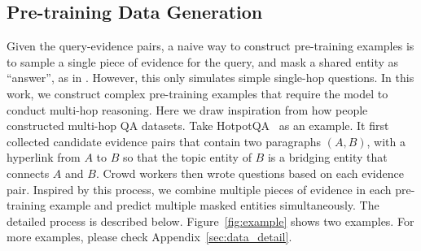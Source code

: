 \documentclass[11pt]{article}
\newcommand{\revise}[1]{#1}
\newcommand{\nop}[1]{}
\begin{document}
\begin{table}[t]
    \centering
    \vspace{-0.5em}
    \caption{Statistics about the pre-training data.}\vspace{-0.25em}
    \label{tab:pretrain_data}
\end{table}

\begin{table}[t]
    \centering
    \vspace{-0.5em}
    \caption{\revise{Analysis of pre-training data quality with 50 examples for each setting. \textit{One different} is when  the relation between the selected entities is different from the relation expressed in the query sentence for of the two pieces of evidence.}}\vspace{-1.25em}
    \label{tab:pretrain_data_quality}
\end{table} \subsection{Pre-training Data Generation}
\label{sec:data_generation}
Given the query-evidence pairs, a naive way to construct pre-training examples is to sample a single piece of evidence for the query, and mask a shared entity as ``answer'', as in \citet{glass-etal-2020-span}. However, this only simulates simple single-hop questions. In this work, we construct complex pre-training examples that require the model to conduct multi-hop reasoning\nop{ to encourage the model to do deep reasoning}. Here we draw inspiration from how people constructed multi-hop QA datasets. Take HotpotQA~\cite{yang-etal-2018-hotpotqa} as an example. It first collected candidate evidence pairs that contain two paragraphs $(A,B)$, with a hyperlink from $A$ to $B$ so that the topic entity of $B$ is a bridging entity that connects $A$ and $B$. Crowd workers then wrote questions based on each evidence pair. Inspired by this process, we combine multiple pieces of evidence in each pre-training example and predict multiple masked entities simultaneously. The detailed process is described below. Figure~\ref{fig:example} shows two examples. For more examples, please check Appendix~\ref{sec:data_detail}.
\end{document}
